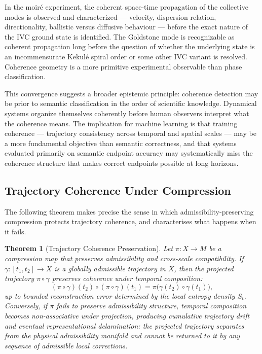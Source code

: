 \documentclass[11pt,a4paper]{article}
\theoremstyle{plain}
\newtheorem{theorem}{Theorem}[section]
\theoremstyle{definition}
\theoremstyle{remark}
\begin{document}
In the moiré experiment, the coherent space-time propagation of the
collective modes is observed and characterized --- velocity, dispersion
relation, directionality, ballistic versus diffusive behaviour --- before the
exact nature of the IVC ground state is identified. The Goldstone mode is
recognizable as coherent propagation long before the question of whether
the underlying state is an incommensurate Kekul\'{e} spiral order or some
other IVC variant is resolved. Coherence geometry is a more primitive
experimental observable than phase classification.

This convergence suggests a broader epistemic principle: coherence
detection may be prior to semantic classification in the order of scientific
knowledge. Dynamical systems organize themselves coherently before human
observers interpret what the coherence means. The implication for machine
learning is that training coherence --- trajectory consistency across temporal
and spatial scales --- may be a more fundamental objective than semantic
correctness, and that systems evaluated primarily on semantic endpoint
accuracy may systematically miss the coherence structure that makes correct
endpoints possible at long horizons.

\subsection{Trajectory Coherence Under Compression}

The following theorem makes precise the sense in which admissibility-preserving
compression protects trajectory coherence, and characterises what happens
when it fails.

\begin{theorem}[Trajectory Coherence Preservation]
\label{thm:coherence}
Let $\pi: X \to M$ be a compression map that preserves admissibility and
cross-scale compatibility. If $\gamma: [t_1, t_2] \to X$ is a globally
admissible trajectory in $X$, then the projected trajectory
$\pi \circ \gamma$ preserves coherence under temporal composition:
\[
(\pi \circ \gamma)(t_2) \circ (\pi \circ \gamma)(t_1)
= \pi\bigl(\gamma(t_2) \circ \gamma(t_1)\bigr),
\]
up to bounded reconstruction error determined by the local entropy density
$S_t$. Conversely, if $\pi$ fails to preserve admissibility structure,
temporal composition becomes non-associative under projection, producing
cumulative trajectory drift and eventual \emph{representational
delamination}: the projected trajectory separates from the physical
admissibility manifold and cannot be returned to it by any sequence of
admissible local corrections.
\end{theorem}
\end{document}
